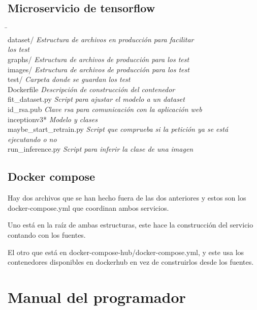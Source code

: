 \subsection{Microservicio de tensorflow}
\begin{tabbing}

\hphantom{tab tab tab tab tab tab tab tab }\= \kill\\
dataset/ \> \textit{Estructura de archivos en producción para facilitar} \\
\> \textit{los test} \\
graphs/ \> \textit{Estructura de archivos de producción para los test} \\
images/ \> \textit{Estructura de archivos de producción para los test} \\
test/ \> \textit{Carpeta donde se guardan los test} \\
Dockerfile \> \textit{Descripción de construcción del contenedor} \\
fit\_dataset.py \> \textit{Script para ajustar el modelo a un dataset} \\
id\_rsa.pub \> \textit{Clave rsa para comunicación con la aplicación web} \\
inceptionv3* \> \textit{Modelo y clases} \\
maybe\_start\_retrain.py \> \textit{Script que comprueba si la petición ya se está} \\ 
\> \textit{ejecutando o no} \\
run\_inference.py \> \textit{Script para inferir la clase de una imagen} \\
\end{tabbing}

\subsection{Docker compose}
Hay dos archivos que se han hecho fuera de las dos anteriores y estos son los docker-compose.yml que coordinan ambos servicios. 

Uno está en la raíz de ambas estructuras, este hace la construcción del servicio contando con los fuentes.

El otro que está en docker-compose-hub/docker-compose.yml, y este usa los contenedores disponibles en dockerhub en vez de construirlos desde los fuentes.


\section{Manual del programador}

